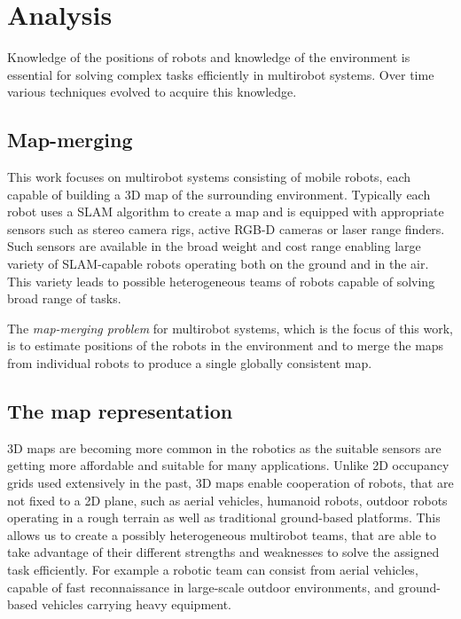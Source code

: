 \chapter{Analysis}
\label{chap:analysis}

Knowledge of the positions of robots and knowledge of the environment is essential for solving complex tasks efficiently in multirobot systems. Over time various techniques evolved to acquire this knowledge.

\section{Map-merging}

This work focuses on multirobot systems consisting of mobile robots, each capable of building a \gls{3D} map of the surrounding environment. Typically each robot uses a \gls{SLAM} algorithm to create a map and is equipped with appropriate sensors such as stereo camera rigs, active \gls{RGB-D} cameras or laser range finders. Such sensors are available in the broad weight and cost range enabling large variety of \gls{SLAM}-capable robots operating both on the ground and in the air. This variety leads to possible heterogeneous teams of robots capable of solving broad range of tasks.

The \textit{map-merging problem} for multirobot systems, which is the focus of this work, is to estimate positions of the robots in the environment and to merge the maps from individual robots to produce a single globally consistent map.

\section{The map representation}

\Gls{3D} maps are becoming more common in the robotics as the suitable sensors are getting more affordable and suitable for many applications. Unlike \gls{2D} occupancy grids used extensively in the past, \gls{3D} maps enable cooperation of robots, that are not fixed to a \gls{2D} plane, such as aerial vehicles, humanoid robots, outdoor robots operating in a rough terrain as well as traditional ground-based platforms. This allows us to create a possibly heterogeneous multirobot teams, that are able to take advantage of their different strengths and weaknesses to solve the assigned task efficiently. For example a robotic team can consist from aerial vehicles, capable of fast reconnaissance in large-scale outdoor environments, and ground-based vehicles carrying heavy equipment.

